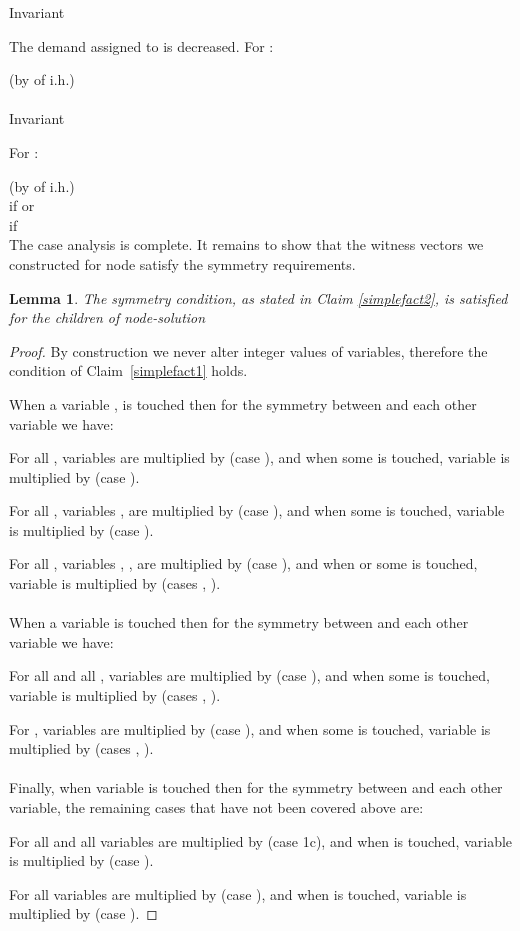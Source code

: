 \documentclass[11pt]{article}\usepackage{amsmath}
\newtheorem{lemma}{Lemma}[section]
\begin{document}
{\sf Invariant }

The demand assigned to  is decreased. For :

\noindent
\hfill (by  of i.h.)\\
\\

{\sf Invariant }

For :

\noindent
\hfill (by  of i.h.)\\
\hfill if  or \\
\hfill if \\ 


\medskip \medskip 
The case analysis is complete. 
It remains to show that the witness vectors we constructed for node
 satisfy the symmetry requirements. 




\begin{lemma}\label{symmetry}
The symmetry condition, as stated in Claim \ref{simplefact2},
 is satisfied  for  the children of node-solution 
\end{lemma}

\begin{proof}
By construction we never alter integer values of variables, therefore
the condition of Claim~\ref{simplefact1} holds. 

When a variable  ,  is touched then  for the symmetry between
 and each other variable we have:

 For all , variables  are multiplied by  (case ), and when
 some  is touched, variable  is multiplied by  (case ).

  For  all  ,   variables  ,     are  multiplied  by
   (case ), and when some  is
  touched, variable  is multiplied by 
  (case ).

 For all , variables , ,  are
 multiplied  by   (case  ),  and when    or  some   is
 touched, variable  is multiplied by  (cases , ). \\\\


When  a variable    is  touched then  for the  symmetry
between  and each other variable we have:

For all    and all  , variables   are multiplied  by 
(case  ),  and  when  some    is  touched,  variable    is
multiplied by  (cases , ).

  For , variables   are multiplied by   (case ), and
  when some  is touched,  variable  is multiplied by  (cases
  , ). \\\\



Finally, when  variable    is  touched then  for the  symmetry
between  and each other variable, the remaining cases that have not been
covered above are: 

For all  and all   variables  are multiplied
by    (case  1c), and  when    is  touched, variable    is
multiplied by  (case ). 

For all   variables  are multiplied by  (case
),  and when   is touched,  variable   is multiplied  by 
(case ). 

 

\end{proof}
\end{document}
